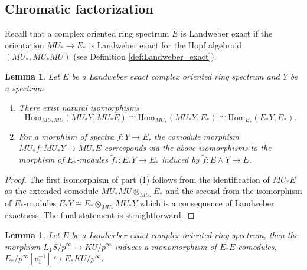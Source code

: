 \documentclass[10pt,a4paper]{amsart}
\newtheorem{lem}[thm]{Lemma}
\theoremstyle{definition}
\theoremstyle{remark}
\renewcommand{\hom}{\mathrm{Hom}}
\renewcommand{\smash}{\wedge}
\begin{document}
\subsection{Chromatic factorization}


Recall that a complex oriented ring spectrum $E$ is Landweber exact if the orientation $MU_* \rightarrow E_*$ is
Landweber exact for the Hopf algebroid $(MU_* , MU_*MU)$ (see Definition \ref{def:Landweber_exact}).

\begin{lem}
\label{lem:Landweber_exact}
	Let $E$ be a Landweber exact complex oriented ring spectrum and $Y$ be a spectrum.
	\begin{enumerate}
		\item There exist natural isomorphisms
		\[
			\hom_{MU_* MU} (MU_* Y, MU_* E) \cong \hom_{MU_*} (MU_* Y , E_*)
			\cong
			\hom_{E_*} (E_* Y, E_*).
		\]
\item
For a morphism of spectra $f : Y \rightarrow E$, the comodule morphism $MU_* f : MU_* Y \rightarrow MU_* E$ corresponds
via the above isomorphisms to the morphism of $E_*$-modules $\tilde{f}_* : E_* Y \rightarrow E_*$ induced by  $
\tilde{f}: E \smash Y \rightarrow E$.
\end{enumerate}
\end{lem}

\begin{proof}
The first isomorphism of part (1) follows from the identification of $MU_*E$ as the extended comodule $MU_*MU \otimes_{MU_*}  E_*$ and the second from the isomorphism of $E_*$-modules $E_* Y \cong E_* \otimes_{MU_*} MU_* Y$ which is a consequence of Landweber exactness. The final statement is straightforward.
\end{proof}


\begin{lem}
\label{lem:hattori-stong}
	Let $E$ be a Landweber exact complex oriented ring spectrum, then
the morphism $L_1 S /p^\infty \rightarrow KU/p^\infty$ induces a monomorphism of $E_* E$-comodules, $E_* /p^\infty [v_1^{-1}]  \hookrightarrow
E_* KU /p^\infty$.
\end{lem}
\end{document}
